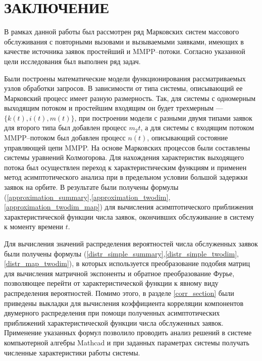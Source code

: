 \section*{ЗАКЛЮЧЕНИЕ}
В рамках данной работы был рассмотрен ряд Марковских систем массового обслуживания с повторными вызовами и вызываемыми заявками, имеющих в качестве источника заявок простейший и MMPP--потоки. Согласно указанной цели исследования был выполнен ряд задач.

Были построены математические модели функционирования рассматриваемых узлов обработки запросов. В зависимости от типа системы, описывающий ее Марковский процесс имеет разную размерность. Так, для системы с одномерным выходящим потоком и простейшим входящим он будет трехмерным --- $\{k(t),i(t),m(t)\}$, при построении модели с разными двумя типами заявок для второго типа был добавлен процесс $m_{2}t$, а для системы с входящим потоком MMPP--потоком был добавлен процесс $n(t)$, описывающий состояние управляющей цепи MMPP. На основе Марковских процессов были составлены системы уравнений Колмогорова. Для нахождения характеристик выходящего потока был осуществлен переход к характеристическим функциям и применен метод асимптотического анализа при в предельном условии большой задержки заявок на орбите. В результате были получены формулы (\ref{approximation_summary},\ref{approximation_twodim},\ref{approximation_twodim_map}) для вычисления асимптотического приближения характеристической функции числа заявок, окончивших обслуживание в систему к моменту времени $t$.

Для вычисления значений распределения вероятностей числа обслуженных заявок были получены формулы (\ref{distr_simple_summary},\ref{distr_simple_twodim},\ref{distr_map_twodim}), в которых используется преобразование подобия матриц для вычисления матричной экспоненты и обратное преобразование Фурье, позволяющее перейти от характеристической функции к явному виду распределения вероятностей. Помимо этого, в разделе \ref{corr_section} были приведены выкладки для вычисления коэффициента корреляции компонентов двумерного распределения при помощи полученных асимптотических приближений характеристической функции числа обслуженных заявок. Применение указанных формул позволило проводить анализ решений в системе компьютерной алгебры Mathcad и при заданных параметрах системы получать численные характеристики работы системы.

